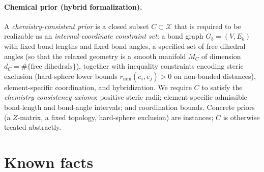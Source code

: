 \documentclass[11pt]{article}
\begin{document}
\paragraph{Chemical prior (hybrid formalization).}
A \emph{chemistry-consistent prior} is a closed subset $C\subset\mathcal{X}$
that is required to be realizable as an \emph{internal-coordinate constraint
set}: a bond graph $G_b=(V,E_b)$ with fixed bond lengths and fixed bond
angles, a specified set of free dihedral angles (so that the relaxed geometry
is a smooth manifold $M_C$ of dimension $d_C=\#\{\text{free dihedrals}\}$),
together with inequality constraints encoding steric exclusion (hard-sphere
lower bounds $r_{\min}(e_i,e_j)>0$ on non-bonded distances), element-specific
coordination, and hybridization. We require $C$ to satisfy the
\emph{chemistry-consistency axioms}: positive steric radii; element-specific
admissible bond-length and bond-angle intervals; and coordination bounds.
Concrete priors (a $Z$-matrix, a fixed topology, hard-sphere exclusion) are
instances; $C$ is otherwise treated abstractly.

\section*{Known facts}
\end{document}
